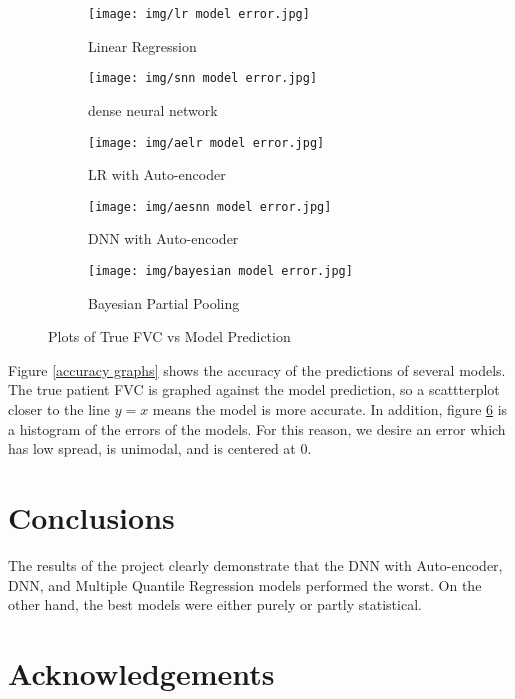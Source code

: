 \documentclass[12pt]{article}
\begin{document}
\begin{figure}[h!]
    \centering

    \begin{subfigure}{.32\textwidth}
        \centering
        \texttt{[image: img/lr model error.jpg]}
        \caption{Linear Regression}
        \label{error:lr}
    \end{subfigure}
    \begin{subfigure}{.32\textwidth}
        \centering
        \texttt{[image: img/snn model error.jpg]}
        \caption{dense neural network}
        \label{error:dnn}
    \end{subfigure}
    \begin{subfigure}{.32\textwidth}
        \centering
        \texttt{[image: img/aelr model error.jpg]}
        \caption{LR with Auto-encoder}
        \label{error:aelr}
    \end{subfigure}

    \vspace{0.5em}

    \begin{subfigure}{.33\textwidth}
        \centering
        \texttt{[image: img/aesnn model error.jpg]}
        \caption{DNN with Auto-encoder}
        \label{error:aednn}
    \end{subfigure}
    \begin{subfigure}{.33\textwidth}
        \centering
        \texttt{[image: img/bayesian model error.jpg]}
        \caption{Bayesian Partial Pooling}
        \label{error:bpp}
    \end{subfigure}

    \caption{Plots of True FVC vs Model Prediction}
    \label{error graphs}
\end{figure}

Figure \ref{accuracy graphs} shows the accuracy of the predictions of several models. 
The true patient FVC is graphed against the model prediction, so a scattterplot closer to the line $y=x$ means the model is more accurate.
In addition, figure \ref{error graphs} is a histogram of the errors of the models.
For this reason, we desire an error which has low spread, is unimodal, and is centered at 0.

\section{Conclusions}

The results of the project clearly demonstrate that the DNN with Auto-encoder, DNN, and Multiple Quantile Regression models performed the worst.
On the other hand, the best models were either purely or partly statistical.


\section{Acknowledgements}

\newpage
\printbibliography
\end{document}
